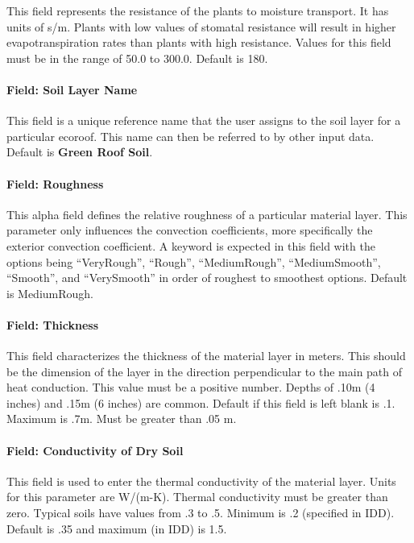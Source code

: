 This field represents the resistance of the plants to moisture transport. It has units of s/m. Plants with low values of stomatal resistance will result in higher evapotranspiration rates than plants with high resistance. Values for this field must be in the range of 50.0 to 300.0. Default is 180.

\paragraph{Field: Soil Layer Name}\label{field-soil-layer-name}

This field is a unique reference name that the user assigns to the soil layer for a particular ecoroof. This name can then be referred to by other input data. Default is \textbf{Green Roof Soil}.

\paragraph{Field: Roughness}\label{field-roughness-2}

This alpha field defines the relative roughness of a particular material layer. This parameter only influences the convection coefficients, more specifically the exterior convection coefficient. A keyword is expected in this field with the options being ``VeryRough'', ``Rough'', ``MediumRough'', ``MediumSmooth'', ``Smooth'', and ``VerySmooth'' in order of roughest to smoothest options. Default is MediumRough.

\paragraph{Field: Thickness}\label{field-thickness-9}

This field characterizes the thickness of the material layer in meters. This should be the dimension of the layer in the direction perpendicular to the main path of heat conduction. This value must be a positive number. Depths of .10m (4 inches) and .15m (6 inches) are common. Default if this field is left blank is .1. Maximum is .7m. Must be greater than .05 m.

\paragraph{Field: Conductivity of Dry Soil}\label{field-conductivity-of-dry-soil}

This field is used to enter the thermal conductivity of the material layer. Units for this parameter are W/(m-K). Thermal conductivity must be greater than zero. Typical soils have values from .3 to .5. Minimum is .2 (specified in IDD). Default is .35 and maximum (in IDD) is 1.5.


